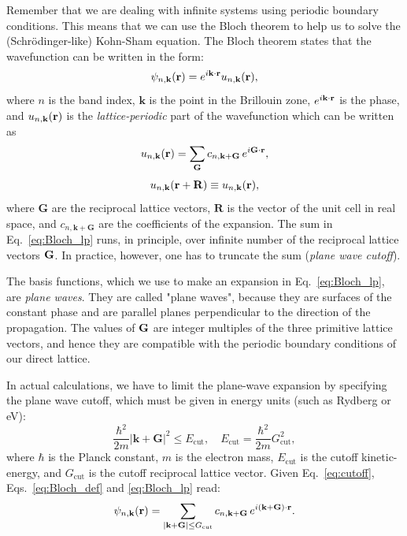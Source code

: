 \documentclass[12pt]{article}
\begin{document}
    Remember that we are dealing with infinite systems using periodic boundary
    conditions. This means that we can use the Bloch theorem to help us
    to solve the (Schr\"{o}dinger-like) Kohn-Sham equation.
    The Bloch theorem states that the wavefunction can be written in the form:
    \begin{equation}
        \psi_{n, {\bf k}}(\mathbf{r}) = e^{i{\bf k}\cdot{\bf r}} u_{n, {\bf k}}({\bf r}),
        \label{eq:Bloch_def}
    \end{equation}
    where $n$ is the band index, $\mathbf{k}$ is the point in the Brillouin zone,
    $e^{i{\bf k}\cdot{\bf r}}$ is the phase, and $u_{n, {\bf k}}({\bf r})$ is the
    {\it lattice-periodic} part of the wavefunction which can be written as 
    \begin{equation}
        u_{n, {\bf k}}({\bf r}) = \sum_{\bf G} c_{n, \mathbf{k+G}} \, e^{i {\bf G}\cdot{\bf r}} ,
        \label{eq:Bloch_lp}
    \end{equation}
    \begin{equation}
        u_{n, {\bf k}}({\bf r+ R}) \equiv u_{n, {\bf k}}({\bf r}) ,
    \end{equation}
    where $\mathbf{G}$ are the reciprocal lattice vectors, $\mathbf{R}$ is the vector
    of the unit cell in real space, and $c_{n, \mathbf{k+G}}$ are the coefficients of
    the expansion. The sum in Eq.~\eqref{eq:Bloch_lp} runs, in principle, over infinite
    number of the reciprocal lattice vectors ${\bf G}$. In practice, however, one has
    to truncate the sum ({\it plane wave cutoff}).
       
    The basis functions, which we use to make an expansion in Eq.~\eqref{eq:Bloch_lp},
    are {\it plane waves}. They are called "plane waves", because they are surfaces of
    the constant phase and are parallel planes perpendicular to the direction of the
    propagation. The values of $\bf G$ are integer multiples of the three primitive
    lattice vectors, and hence they are compatible with the periodic boundary conditions
    of our direct lattice.

    In actual calculations, we have to limit the plane-wave expansion by specifying the
    plane wave cutoff, which must be given in energy units (such as Rydberg or eV):
    \begin{equation}
    \frac{\hbar^2}{2m} |\mathbf{k}+\mathbf{G}|^2 \leq E_\mathrm{cut} , \quad E_\mathrm{cut} = \frac{\hbar^2}{2m} G^2_\mathrm{cut} ,
    \label{eq:cutoff}
    \end{equation}
    where $\hbar$ is the Planck constant, $m$ is the electron mass, $E_\mathrm{cut}$
    is the cutoff kinetic-energy, and $G_\mathrm{cut}$ is the cutoff reciprocal lattice
    vector.
    Given Eq.~\eqref{eq:cutoff}, Eqs.~\eqref{eq:Bloch_def} and \eqref{eq:Bloch_lp} read:
    \begin{equation}
      \psi_{n, {\bf k}}(\mathbf{r}) = \sum_{|\mathbf{k+G}| \leq G_\mathrm{cut}} c_{n, \mathbf{k+G}} \, e^{i (\mathbf{k+G})\cdot{\bf r}} .
    \end{equation}
\end{document}
